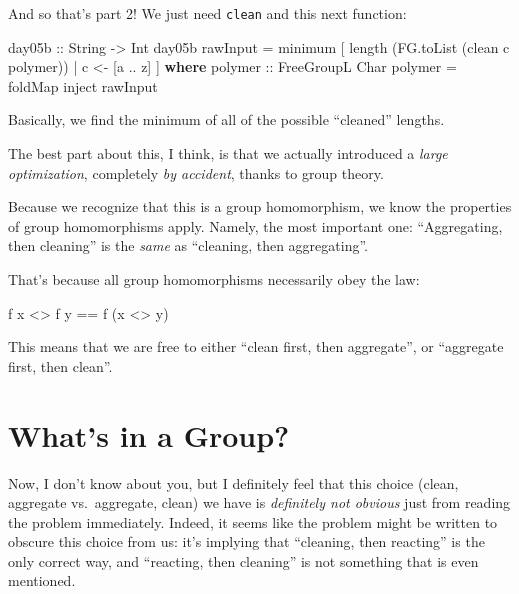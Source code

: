 \documentclass[]{article}
\newenvironment{Shaded}{}{}
\newcommand{\CharTok}[1]{\textcolor[rgb]{0.25,0.44,0.63}{#1}}
\newcommand{\DataTypeTok}[1]{\textcolor[rgb]{0.56,0.13,0.00}{#1}}
\newcommand{\FunctionTok}[1]{\textcolor[rgb]{0.02,0.16,0.49}{#1}}
\newcommand{\KeywordTok}[1]{\textcolor[rgb]{0.00,0.44,0.13}{\textbf{#1}}}
\newcommand{\NormalTok}[1]{#1}
\newcommand{\OperatorTok}[1]{\textcolor[rgb]{0.40,0.40,0.40}{#1}}
\newcommand{\OtherTok}[1]{\textcolor[rgb]{0.00,0.44,0.13}{#1}}
\begin{document}
And so that's part 2! We just need \texttt{clean} and this next function:

\begin{Shaded}
\begin{Highlighting}[]
\OtherTok{day05b ::} \DataTypeTok{String} \OtherTok{{-}>} \DataTypeTok{Int}
\NormalTok{day05b rawInput }\OtherTok{=} \FunctionTok{minimum}
\NormalTok{    [ }\FunctionTok{length}\NormalTok{ (FG.toList (clean c polymer))}
    \OperatorTok{|}\NormalTok{ c }\OtherTok{<{-}}\NormalTok{ [}\CharTok{\textquotesingle{}a\textquotesingle{}} \OperatorTok{..} \CharTok{\textquotesingle{}z\textquotesingle{}}\NormalTok{]}
\NormalTok{    ]}
  \KeywordTok{where}
\OtherTok{    polymer ::} \DataTypeTok{FreeGroupL} \DataTypeTok{Char}
\NormalTok{    polymer }\OtherTok{=} \FunctionTok{foldMap}\NormalTok{ inject rawInput}
\end{Highlighting}
\end{Shaded}

Basically, we find the minimum of all of the possible ``cleaned'' lengths.

The best part about this, I think, is that we actually introduced a \emph{large
optimization}, completely \emph{by accident}, thanks to group theory.

Because we recognize that this is a group homomorphism, we know the properties
of group homomorphisms apply. Namely, the most important one: ``Aggregating,
then cleaning'' is the \emph{same} as ``cleaning, then aggregating''.

That's because all group homomorphisms necessarily obey the law:

\begin{Shaded}
\begin{Highlighting}[]
\NormalTok{f x }\OperatorTok{<>}\NormalTok{ f y }\OperatorTok{==}\NormalTok{ f (x }\OperatorTok{<>}\NormalTok{ y)}
\end{Highlighting}
\end{Shaded}

This means that we are free to either ``clean first, then aggregate'', or
``aggregate first, then clean''.

\hypertarget{whats-in-a-group}{%
\section{What's in a Group?}\label{whats-in-a-group}}

Now, I don't know about you, but I definitely feel that this choice (clean,
aggregate vs.~aggregate, clean) we have is \emph{definitely not obvious} just
from reading the problem immediately. Indeed, it seems like the problem might be
written to obscure this choice from us: it's implying that ``cleaning, then
reacting'' is the only correct way, and ``reacting, then cleaning'' is not
something that is even mentioned.
\end{document}
